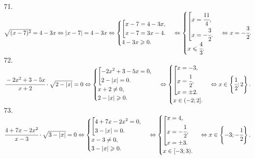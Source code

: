 71. $\sqrt{(x-7)^2}=4-3x\Leftrightarrow|x-7|=4-3x\Leftrightarrow\begin{cases}\left[
      \begin{gathered} x-7=4-3x,\hfill\\
      x-7=3x-4.\hfill \end{gathered}\right.\\
4-3x\geqslant0.\end{cases}\Leftrightarrow\begin{cases}\left[
      \begin{gathered} x=\cfrac{11}{4},\hfill\\
      x=-\cfrac{3}{2}.\hfill \end{gathered}\right.\\
x\leqslant\cfrac{4}{3}.\end{cases}\Leftrightarrow x=-\cfrac{3}{2}.$\\
72. $\cfrac{-2x^2+3-5x}{x+2}\cdot\sqrt{2-|x|}=0\Leftrightarrow\begin{cases}\left[
      \begin{gathered} -2x^2+3-5x=0,\hfill\\
      2-|x|=0.\hfill \end{gathered}\right.\\
      x+2\neq0,\\
2-|x|\geqslant0.\end{cases}\Leftrightarrow\begin{cases}\left[
      \begin{gathered} x=-3,\hfill\\
      x=\cfrac{1}{2},\hfill\\
      x=\pm2.\hfill \end{gathered}\right.\\
      x\in(-2;2].\end{cases}\Leftrightarrow x\in \left \{\cfrac{1}{2};2\right\}.$\\
73. $\cfrac{4+7x-2x^2}{x-3}\cdot\sqrt{3-|x|}=0\Leftrightarrow\begin{cases}\left[
      \begin{gathered} 4+7x-2x^2=0,\hfill\\
      3-|x|=0.\hfill \end{gathered}\right.\\
      x-3\neq0,\\
3-|x|\geqslant0.\end{cases}\Leftrightarrow\begin{cases}\left[
      \begin{gathered} x=4  ,\hfill\\
      x=-\cfrac{1}{2},\hfill\\
      x=\pm3.\hfill \end{gathered}\right.\\
      x\in[-3;3).\end{cases}\Leftrightarrow x\in \left \{-3;-\cfrac{1}{2}\right\}.$\\
